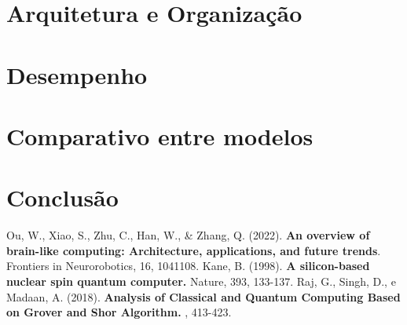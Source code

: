 \documentclass[a4paper,times,12pt]{article}
\begin{document}
\section{Arquitetura e Organização}
\hspace{+15pt}

\section{Desempenho}
\hspace{+15pt}


\section{Comparativo entre modelos}
\hspace{+15pt}


\section{Conclusão}
\hspace{+15pt}



\newpage
\begin{thebibliography}{00}
 Ou, W., Xiao, S., Zhu, C., Han, W., \& Zhang, Q. (2022). 
\textbf{An overview of brain-like computing: Architecture, applications, and future trends}. Frontiers in Neurorobotics, 16, 1041108.
Kane, B. (1998). 
\textbf{A silicon-based nuclear spin quantum computer. } Nature, 393, 133-137.
 Raj, G., Singh, D., e Madaan, A. (2018).
\textbf{ Analysis of Classical and Quantum Computing Based on Grover and Shor Algorithm. }, 413-423.
\end{thebibliography}
\end{document}
